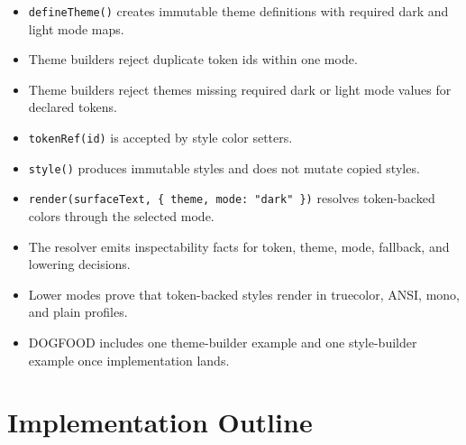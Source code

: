 \begin{itemize}
\tightlist
\item
  \texttt{d\allowbreak{}e\allowbreak{}f\allowbreak{}i\allowbreak{}n\allowbreak{}e\allowbreak{}T\allowbreak{}h\allowbreak{}e\allowbreak{}m\allowbreak{}e\allowbreak{}(\allowbreak{})} creates immutable theme definitions with required dark and light mode maps.
\item
  Theme builders reject duplicate token ids within one mode.
\item
  Theme builders reject themes missing required dark or light mode values for declared tokens.
\item
  \texttt{t\allowbreak{}o\allowbreak{}k\allowbreak{}e\allowbreak{}n\allowbreak{}R\allowbreak{}e\allowbreak{}f\allowbreak{}(\allowbreak{}i\allowbreak{}d\allowbreak{})} is accepted by style color setters.
\item
  \texttt{s\allowbreak{}t\allowbreak{}y\allowbreak{}l\allowbreak{}e\allowbreak{}(\allowbreak{})} produces immutable styles and does not mutate copied styles.
\item
  \texttt{r\allowbreak{}e\allowbreak{}n\allowbreak{}d\allowbreak{}e\allowbreak{}r\allowbreak{}(\allowbreak{}s\allowbreak{}u\allowbreak{}r\allowbreak{}f\allowbreak{}a\allowbreak{}c\allowbreak{}e\allowbreak{}T\allowbreak{}e\allowbreak{}x\allowbreak{}t\allowbreak{},\allowbreak{} \allowbreak{}\{\allowbreak{} \allowbreak{}t\allowbreak{}h\allowbreak{}e\allowbreak{}m\allowbreak{}e\allowbreak{},\allowbreak{} \allowbreak{}m\allowbreak{}o\allowbreak{}d\allowbreak{}e\allowbreak{}:\allowbreak{} \allowbreak{}"\allowbreak{}d\allowbreak{}a\allowbreak{}r\allowbreak{}k\allowbreak{}"\allowbreak{} \allowbreak{}\}\allowbreak{})} resolves token-backed colors through the selected mode.
\item
  The resolver emits inspectability facts for token, theme, mode, fallback, and lowering decisions.
\item
  Lower modes prove that token-backed styles render in truecolor, ANSI, mono, and plain profiles.
\item
  DOGFOOD includes one theme-builder example and one style-builder example once implementation lands.
\end{itemize}

\section{Implementation Outline}\label{record-178-implementation-outline}

